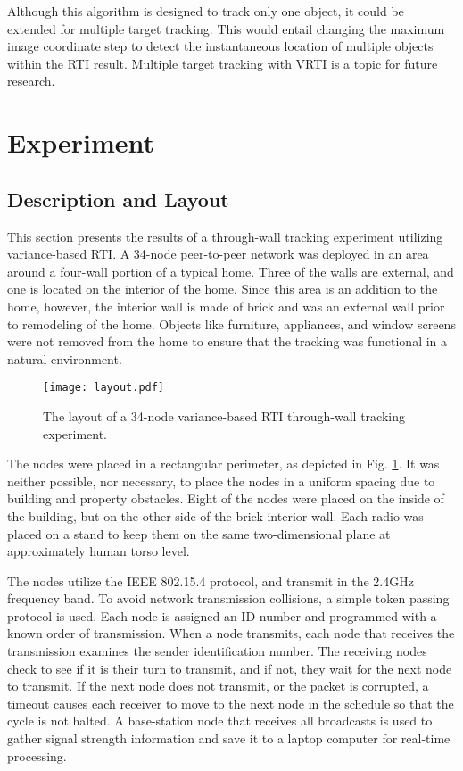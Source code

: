 \documentclass[journal]{IEEEtran}
\begin{document}
Although this algorithm is designed to track only one object, it could be extended for multiple target tracking. This would entail changing the maximum image coordinate step to detect the instantaneous location of multiple objects within the RTI result. Multiple target tracking with VRTI is a topic for future research.

\section{Experiment}\label{section.experiment}
\subsection{Description and Layout}

This section presents the results of a through-wall tracking experiment utilizing variance-based RTI. A 34-node peer-to-peer network was deployed in an area around a four-wall portion of a typical home. Three of the walls are external, and one is located on the interior of the home. Since this area is an addition to the home, however, the interior wall is made of brick and was an external wall prior to remodeling of the home. Objects like furniture, appliances, and window screens were not removed from the home to ensure that the tracking was functional in a natural environment.

\begin{figure}[ht]
\centering
\texttt{[image: layout.pdf]}
\caption{The layout of a 34-node variance-based RTI through-wall tracking experiment.}
\label{fig.layout}
\end{figure}

The nodes were placed in a rectangular perimeter, as depicted in Fig. \ref{fig.layout}. It was neither possible, nor necessary, to place the nodes in a uniform spacing due to building and property obstacles. Eight of the nodes were placed on the inside of the building, but on the other side of the brick interior wall. Each radio was placed on a stand to keep them on the same two-dimensional plane at approximately human torso level. 

The nodes utilize the IEEE 802.15.4 protocol, and transmit in the 2.4GHz frequency band. To avoid network transmission collisions, a simple token passing protocol is used.  Each node is assigned an ID number and programmed with a known order of transmission. When a node transmits, each node that receives the transmission examines the sender identification number. The receiving nodes check to see if it is their turn to transmit, and if not, they wait for the next node to transmit. If the next node does not transmit, or the packet is corrupted, a timeout causes each receiver to move to the next node in the schedule so that the cycle is not halted. A base-station node that receives all broadcasts is used to gather signal strength information and save it to a laptop computer for real-time processing.
\end{document}
